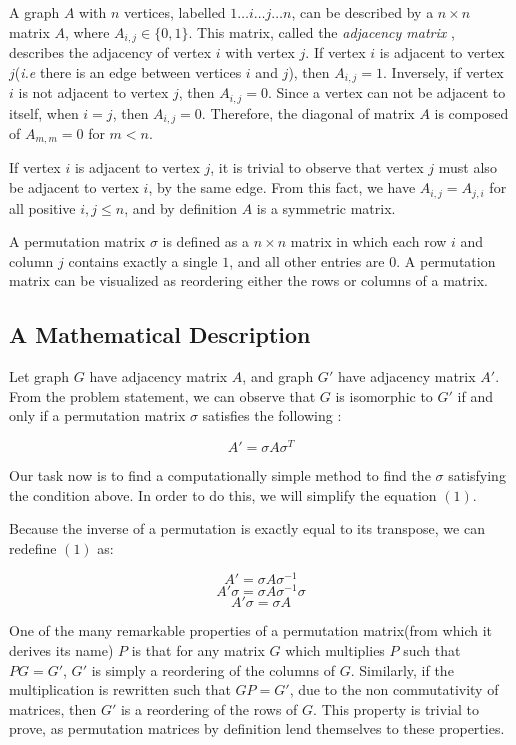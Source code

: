 \documentclass[12pt]{article}
\begin{document}
A graph $A$ with $n$ vertices, labelled $1\ldots i\ldots j \ldots n$, can be described by a $n \times n$ matrix $A$, where $A_{i,j}\in\{0,1\}$. This matrix, called the \textit{adjacency matrix}\cite{1} , describes the adjacency of vertex $i$ with vertex $j$. If vertex $i$ is adjacent to vertex $j$(\textit{i.e} there is an edge between vertices $i$ and $j$), then $A_{i,j} = 1$. Inversely, if vertex $i$ is not adjacent to vertex $j$, then $A_{i,j} = 0$. Since a vertex can not be adjacent to itself, when $i=j$, then $A_{i,j} = 0$. Therefore, the diagonal of matrix $A$ is composed of $A_{m,m} = 0$ for $m<n$.

If vertex $i$ is adjacent to vertex $j$, it is trivial to observe that vertex $j$ must also be adjacent to vertex $i$, by the same edge. From this fact, we have $A_{i,j} = A_{j,i}$ for all positive $i,j \le n$, and by definition $A$ is a symmetric matrix.

A permutation matrix $\sigma$ is defined as a $n \times n$ matrix in which each row $i$ and column $j$ contains exactly a single $1$, and all other entries are $0$. A permutation matrix can be visualized as reordering either the rows or columns of a matrix.


\subsection{A Mathematical Description}


Let graph $G$ have adjacency matrix $A$, and graph $G'$ have adjacency matrix $A'$. From the problem statement, we can observe that $G$ is isomorphic to $G'$ if and only if a permutation matrix $\sigma$ satisfies the following\cite{1} :

\begin{equation}
A' = \sigma A \sigma^T
\end{equation}

Our task now is to find a computationally simple method to find the $\sigma$ satisfying the condition above. In order to do this, we will simplify the equation $(1)$.

Because the inverse of a permutation is exactly equal to its transpose, we can redefine $(1)$ as:

\[A' = \sigma A \sigma^{-1}\]
\[A' \sigma = \sigma A \sigma^{-1} \sigma\]
\begin{equation}
A' \sigma = \sigma A
\end{equation}

One of the many remarkable properties of a permutation matrix(from which it derives its name) $P$ is that for any matrix $G$ which multiplies $P$ such that $PG = G'$, $G'$ is simply a reordering of the columns of $G$. Similarly, if the multiplication is rewritten such that $GP = G'$, due to the non commutativity of matrices, then $G'$ is a reordering of the rows of $G$. This property is trivial to prove, as permutation matrices by definition lend themselves to these properties.
\end{document}

